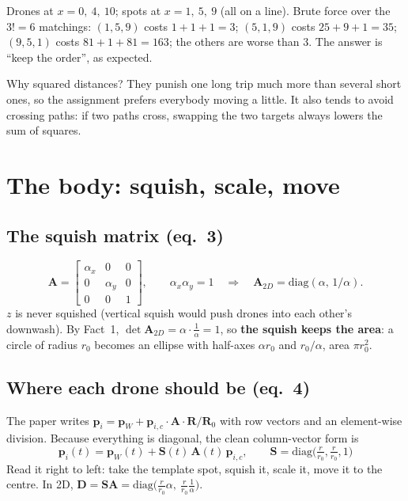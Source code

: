 \documentclass[11pt,a4paper]{article}
\newcommand{\vect}[1]{\mathbf{#1}}
\newcommand{\pW}{\vect{p}_W}
\begin{document}
\begin{examplebox}
Drones at $x=0,\ 4,\ 10$; spots at $x=1,\ 5,\ 9$ (all on a line). Brute force over the $3!=6$ matchings:
$(1,5,9)$ costs $1+1+1=3$; $(5,1,9)$ costs $25+9+1=35$; $(9,5,1)$ costs $81+1+81=163$; the others are worse than
3. The answer is ``keep the order'', as expected.
\end{examplebox}

\begin{plainbox}
Why squared distances? They punish one long trip much more than several short ones, so the assignment prefers
everybody moving a little. It also tends to avoid crossing paths: if two paths cross, swapping the two targets
always lowers the sum of squares.
\end{plainbox}

\section{The body: squish, scale, move}\label{sec:affine}

\subsection{The squish matrix (eq.~3)}
\begin{equation}
\vect{A}=\begin{bmatrix}\alpha_x&0&0\\0&\alpha_y&0\\0&0&1\end{bmatrix},\qquad\alpha_x\alpha_y=1
\quad\Rightarrow\quad \vect{A}_{2D}=\mathrm{diag}(\alpha,\,1/\alpha). \tag{3}
\end{equation}
$z$ is never squished (vertical squish would push drones into each other's downwash). By Fact~1,
$\det\vect{A}_{2D}=\alpha\cdot\frac1\alpha=1$, so \textbf{the squish keeps the area}: a circle of radius $r_0$ becomes
an ellipse with half-axes $\alpha r_0$ and $r_0/\alpha$, area $\pi r_0^2$.

\subsection{Where each drone should be (eq.~4)}
The paper writes $\vect{p}_i=\pW+\vect{p}_{i,c}\cdot\vect{A}\cdot\vect{R}/\vect{R}_0$ with row vectors and an
element-wise division. Because everything is diagonal, the clean column-vector form is
\begin{equation}
\boxed{\ \vect{p}_i(t)=\pW(t)+\vect{S}(t)\,\vect{A}(t)\,\vect{p}_{i,c},\qquad
\vect{S}=\mathrm{diag}\!\big(\tfrac{r}{r_0},\tfrac{r}{r_0},1\big)\ }\tag{4}
\end{equation}
Read it right to left: take the template spot, squish it, scale it, move it to the centre. In 2D,
$\vect{D}=\vect{S}\vect{A}=\mathrm{diag}\big(\tfrac{r}{r_0}\alpha,\ \tfrac{r}{r_0}\tfrac1\alpha\big)$.
\end{document}
